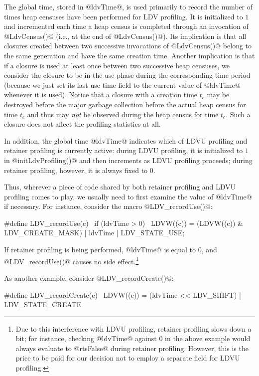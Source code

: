 \documentclass{article}
\begin{document}
The global time, stored in @ldvTime@, is used primarily to record the number
of times heap censuses have been performed for LDV profiling. 
It is initialized to $1$ and incremented each time a heap census is completed 
through an invocation of @LdvCensus()@ (i.e., at the end of @LdvCensus()@).
Its implication is that 
all closures created between two successive invocations of @LdvCensus()@
belong to the same generation and have the same creation time.
Another implication is that 
if a closure is used at least once between two successive heap 
censuses, we consider the closure to be in the use phase 
during the corresponding time period 
(because we just set its last use time field to the current value
of @ldvTime@ whenever it is used).
Notice that a closure with a creation time $t_c$ may be destroyed before
the major garbage collection before the actual heap census for time $t_c$ and thus 
may \emph{not} be observed during the heap census for time $t_c$.
Such a closure does not affect the profiling statistics at all.

In addition, the global time @ldvTime@ indicates
which of LDVU profiling and retainer profiling is currently active:
during LDVU profiling, it is initialized to $1$ in @initLdvProfiling()@
and then increments as LDVU profiling proceeds;
during retainer profiling, however, it is always fixed to $0$.

Thus, wherever a piece of code shared by both retainer profiling and
LDVU profiling comes to play, we usually need to first examine the value of @ldvTime@
if necessary. For instance, consider the macro @LDV_recordUse()@:

\begin{code}
#define LDV_recordUse(c)                              \
  if (ldvTime > 0)                                    \
    LDVW((c)) = (LDVW((c)) & LDV_CREATE_MASK) | ldvTime | LDV_STATE_USE; 
\end{code}

If retainer profiling is being performed, @ldvTime@ is equal to $0$, and
@LDV_recordUse()@ causes no side effect.\footnote{Due to this interference
with LDVU profiling, retainer profiling slows down a bit; for instance, 
checking @ldvTime@ against $0$ in the above example would always evaluate to
@rtsFalse@ during retainer profiling.
However, this is the price to be paid for our decision not to employ a 
separate field for LDVU profiling.}

As another example, consider @LDV_recordCreate()@:

\begin{code}
#define LDV_recordCreate(c)   \
  LDVW((c)) = (ldvTime << LDV_SHIFT) | LDV_STATE_CREATE
\end{code}
\end{document}
